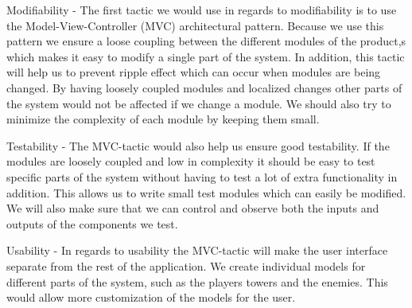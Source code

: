 \label{tactics}

Modifiability - The first tactic we would use in regards to modifiability is to
use the Model-View-Controller (MVC) architectural pattern. Because we use this
pattern we ensure a loose coupling between the different modules of the product,s which makes it easy to modify a single part of the system. In
addition, this tactic will help us to prevent ripple effect which can occur when
modules are being changed. By having loosely coupled modules and localized
changes other parts of the system would not be affected if we change a module.
We should also try to minimize the complexity of each module by keeping them
small.

Testability - The MVC-tactic would also help us ensure good testability. If the
modules are loosely coupled and low in complexity it should be easy to test
specific parts of the system without having to test a lot of extra functionality
in addition. This allows us to write small test modules which can easily be
modified. We will also make sure that we can control and observe both the inputs
and outputs of the components we test.

Usability - In regards to usability the MVC-tactic will make the user interface
separate from the rest of the application. We create individual models for different parts of the system, such as the players towers and the enemies. This would allow more customization of the models for the user.
